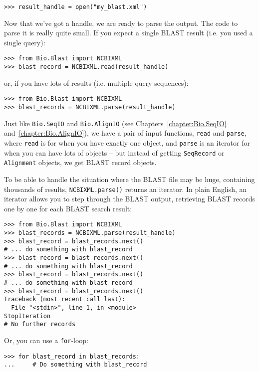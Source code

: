 \documentclass{report}
\begin{document}
\begin{verbatim}
>>> result_handle = open("my_blast.xml")
\end{verbatim}

Now that we've got a handle, we are ready to parse the output. The
code to parse it is really quite small.  If you expect a single
BLAST result (i.e. you used a single query):

\begin{verbatim}
>>> from Bio.Blast import NCBIXML
>>> blast_record = NCBIXML.read(result_handle)
\end{verbatim}

\noindent or, if you have lots of results (i.e. multiple query sequences):

\begin{verbatim}
>>> from Bio.Blast import NCBIXML
>>> blast_records = NCBIXML.parse(result_handle)
\end{verbatim}

Just like \verb|Bio.SeqIO| and \verb|Bio.AlignIO|
(see Chapters~\ref{chapter:Bio.SeqIO} and~\ref{chapter:Bio.AlignIO}),
we have a pair of input functions, \verb|read| and \verb|parse|, where
\verb|read| is for when you have exactly one object, and \verb|parse|
is an iterator for when you can have lots of objects -- but instead of
getting \verb|SeqRecord| or \verb|Alignment| objects, we get BLAST
record objects.

To be able to handle the situation where the BLAST file may be huge,
containing thousands of results, \verb|NCBIXML.parse()| returns an
iterator. In plain English, an iterator allows you to step through
the BLAST output, retrieving BLAST records one by one for each BLAST
search result:

\begin{verbatim}
>>> from Bio.Blast import NCBIXML
>>> blast_records = NCBIXML.parse(result_handle)
>>> blast_record = blast_records.next()
# ... do something with blast_record
>>> blast_record = blast_records.next()
# ... do something with blast_record
>>> blast_record = blast_records.next()
# ... do something with blast_record
>>> blast_record = blast_records.next()
Traceback (most recent call last):
  File "<stdin>", line 1, in <module>
StopIteration
# No further records
\end{verbatim}

Or, you can use a \verb|for|-loop:
\begin{verbatim}
>>> for blast_record in blast_records:
...     # Do something with blast_record
\end{verbatim}
\end{document}
